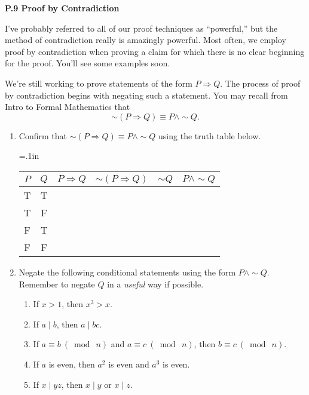 \documentclass[12 pt]{article}
\newcommand{\Ra}{\Rightarrow}
\newcommand{\divides}{\! \mid \!}
\newcommand{\mymod}[1]{ \ (\bmod \ #1)}
\theoremstyle{definition}
\theoremstyle{plain}
\theoremstyle{mytheorem}
\theoremstyle{myexample}
\theoremstyle{mydefinition}
\begin{document}
\begin{center}
\textbf{P.9 Proof by Contradiction}
\end{center}

I've probably referred to all of our proof techniques as ``powerful,'' but the method of contradiction really is amazingly powerful.  Most often, we employ proof by contradiction when proving a claim for which there is no clear beginning for the proof.  You'll see some examples soon.
\begin{center}
\end{center}

\noindent We're still working to prove statements of the form $P \Ra Q$.  The process of proof by contradiction begins with negating such a statement.  You may recall from Intro to Formal Mathematics that
	\[\sim(P \Ra Q) \equiv P \wedge \sim Q.\]
	
\begin{enumerate}
\item Confirm that $\sim(P \Ra Q) \equiv P \wedge \sim Q$ using the truth table below.
\begin{center}
{\tabulinesep=.1in
	\begin{tabu}{c|c||c|c|c|c}
	$P$ & $Q$ & $P \Ra Q$ & $\sim( P \Ra Q)$ & $\sim Q$ & $P \wedge \sim Q$ \\
	\hline
	T & T & \ & \ & \ & \ \\
	T & F & \ & \ & \ & \ \\
	F & T & \ & \ & \ & \ \\
	F & F & \ & \ & \ & \ \\
	\end{tabu}}
\end{center}

\item Negate the following conditional statements using the form $P \wedge \sim Q$.  Remember to negate $Q$ in a \textit{useful} way if possible.
	\begin{enumerate} \itemsep=1in
	\item If $x>1$, then $x^3>x$.
	\item If $a \divides b$, then $a \divides bc$.
	\item If $a \equiv b \mymod{n}$ and $a \equiv c \mymod{n}$, then $b \equiv c \mymod{n}$. 
	\item If $a$ is even, then $a^2$ is even and $a^3$ is even.
	\item If $x \divides yz$, then $x \divides y$ or $x \divides z$.
	\vspace{1in}
	\end{enumerate}
\end{enumerate}
\end{document}

